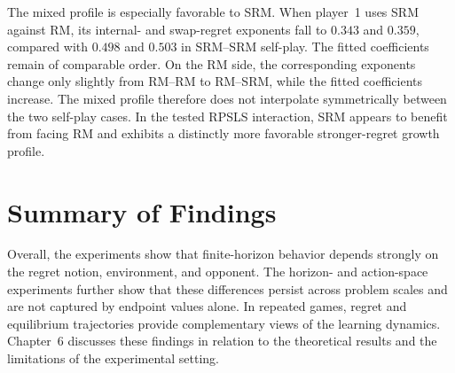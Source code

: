 The mixed profile is especially favorable to SRM. When player~1 uses SRM
against RM, its internal- and swap-regret exponents fall to $0.343$ and
$0.359$, compared with $0.498$ and $0.503$ in SRM--SRM self-play. The fitted
coefficients remain of comparable order. On the RM side, the corresponding
exponents change only slightly from RM--RM to RM--SRM, while the fitted
coefficients increase. The mixed profile therefore does not interpolate
symmetrically between the two self-play cases. In the tested RPSLS interaction,
SRM appears to benefit from facing RM and exhibits a distinctly more favorable
stronger-regret growth profile.



\section{Summary of Findings}
\label{sec:results-summary}

Overall, the experiments show that finite-horizon behavior depends strongly on
the regret notion, environment, and opponent. The horizon- and action-space
experiments further show that these differences persist across problem scales
and are not captured by endpoint values alone. In repeated games, regret and
equilibrium trajectories provide complementary views of the learning dynamics.
Chapter~6 discusses these findings in relation to the theoretical results and
the limitations of the experimental setting.
